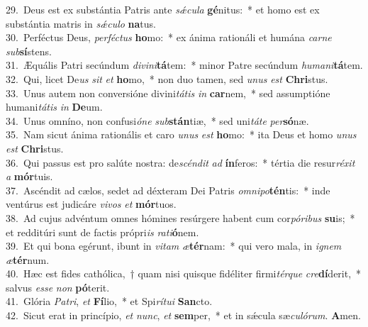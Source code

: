 {29.~}Deus est ex substántia Patris ante \textit{sǽ}\textit{cu}\textit{la} \textbf{gé}nitus:~* et homo est ex substántia matris in \textit{sǽ}\textit{cu}\textit{lo} \textbf{na}tus.\\
{30.~}Perféctus Deus, \textit{per}\textit{fé}\textit{ctus} \textbf{ho}mo:~* ex ánima rationáli et humána \textit{car}\textit{ne} \textit{sub}\textbf{sí}stens.\\
{31.~}Æquális Patri secúndum \textit{di}\textit{vi}\textit{ni}\textbf{tá}tem:~* minor Patre secúndum \textit{hu}\textit{ma}\textit{ni}\textbf{tá}tem.\\
{32.~}Qui, licet De\textit{us} \textit{sit} \textit{et} \textbf{ho}mo,~* non duo tamen, sed \textit{u}\textit{nus} \textit{est} \textbf{Chri}stus.\\
{33.~}Unus autem non conversióne divini\textit{tá}\textit{tis} \textit{in} \textbf{car}nem,~* sed assumptióne humani\textit{tá}\textit{tis} \textit{in} \textbf{De}um.\\
{34.~}Unus omníno, non confusi\textit{ó}\textit{ne} \textit{sub}\textbf{stán}tiæ,~* sed uni\textit{tá}\textit{te} \textit{per}\textbf{só}næ.\\
{35.~}Nam sicut ánima rationális et caro \textit{u}\textit{nus} \textit{est} \textbf{ho}mo:~* ita Deus et homo \textit{u}\textit{nus} \textit{est} \textbf{Chri}stus.\\
{36.~}Qui passus est pro salúte nostra: de\textit{scén}\textit{dit} \textit{ad} \textbf{ín}feros:~* tértia die resur\textit{ré}\textit{xit} \textit{a} \textbf{mór}tuis.\\
{37.~}Ascéndit ad cælos, sedet ad déxteram Dei Patris \textit{om}\textit{ni}\textit{po}\textbf{tén}tis:~* inde ventúrus est judicáre \textit{vi}\textit{vos} \textit{et} \textbf{mór}tuos.\\
{38.~}Ad cujus advéntum omnes hómines resúrgere habent cum cor\textit{pó}\textit{ri}\textit{bus} \textbf{su}is;~* et redditúri sunt de factis própri\textit{is} \textit{ra}\textit{ti}\textbf{ó}nem.\\
{39.~}Et qui bona egérunt, ibunt in \textit{vi}\textit{tam} \textit{æ}\textbf{tér}nam:~* qui vero mala, in \textit{i}\textit{gnem} \textit{æ}\textbf{tér}num.\\
{40.~}Hæc est fides cathólica,~† quam nisi quisque fidéliter firmi\textit{tér}\textit{que} \textit{cre}\textbf{dí}derit,~* salvus \textit{es}\textit{se} \textit{non} \textbf{pó}terit.\\
{41.~}Glória \textit{Pa}\textit{tri}, \textit{et} \textbf{Fí}lio,~* et Spi\textit{rí}\textit{tu}\textit{i} \textbf{San}cto.\\
{42.~}Sicut erat in princípio, \textit{et} \textit{nunc}, \textit{et} \textbf{sem}per,~* et in sǽcula sæ\textit{cu}\textit{ló}\textit{rum}. \textbf{A}men.\\
